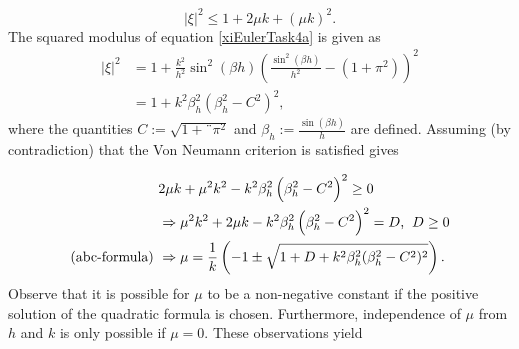\begin{equation*}
    |\xi|^2 \leq 1 + 2\mu k + (\mu k)^2.
\end{equation*}
The squared modulus of equation \eqref{xiEulerTask4a} is given as
\begin{align*}
    |\xi|^2 &= 1 + \frac{k^2}{h^2}\sin^2{(\beta h)} \left(\frac{\sin^2{(\beta h)}}{h^2}-(1+\pi^2)\right)^2 \nonumber \\ &= 1 + k^2 \beta_h^2 \left(\beta_h^2 - C^2\right)^2,
\end{align*}
where the quantities $C:=\sqrt{1+¨\pi^2}$ and $\beta_h:=\frac{\sin{(\beta h)}}{h}$ are defined. Assuming (by contradiction) that the Von Neumann criterion is satisfied gives

\begin{equation*}
    \begin{split}
        & 2\mu k + \mu^2 k^2 -k^2 \beta_h^2 \left(\beta_h^2 - C^2\right)^2 \geq 0\\ & \Rightarrow \mu^2 k^2 + 2\mu k - k^2 \beta_h^2\left(\beta_h^2 -C^2\right)^2 = D \text{,} \hspace{2mm} D \geq 0 \\ \text{(abc-formula) }&\Rightarrow \mu = \frac{1}{k} \left(-1 \pm \sqrt{1 + D + k^2 \beta_h^2 (\beta_h^2-C^2)^2}\right).
    \end{split}
\end{equation*}
Observe that it is possible for $\mu$ to be a non-negative constant if the positive solution of the quadratic formula is chosen. Furthermore, independence of $\mu$ from $h$ and $k$ is only possible if $\mu=0$. These observations yield

